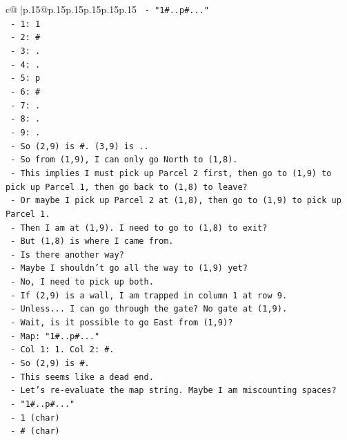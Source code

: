 \documentclass{article}
\begin{document}
{\begin{supertabular}{c@{$\;$}|p{.15\linewidth}@{}p{.15\linewidth}p{.15\linewidth}p{.15\linewidth}p{.15\linewidth}p{.15\linewidth}}
{{{\texttt{   {-} "1\#..p\#..."} \\
\texttt{   {-} 1: 1} \\
\texttt{   {-} 2: \#} \\
\texttt{   {-} 3: .} \\
\texttt{   {-} 4: .} \\
\texttt{   {-} 5: p} \\
\texttt{   {-} 6: \#} \\
\texttt{   {-} 7: .} \\
\texttt{   {-} 8: .} \\
\texttt{   {-} 9: .} \\
\texttt{   {-} So (2,9) is \#. (3,9) is ..} \\
\texttt{   {-} So from (1,9), I can only go North to (1,8).} \\
\texttt{   {-} This implies I must pick up Parcel 2 first, then go to (1,9) to pick up Parcel 1, then go back to (1,8) to leave?} \\
\texttt{   {-} Or maybe I pick up Parcel 2 at (1,8), then go to (1,9) to pick up Parcel 1.} \\
\texttt{   {-} Then I am at (1,9). I need to go to (1,8) to exit?} \\
\texttt{   {-} But (1,8) is where I came from.} \\
\texttt{   {-} Is there another way?} \\
\texttt{   {-} Maybe I shouldn't go all the way to (1,9) yet?} \\
\texttt{   {-} No, I need to pick up both.} \\
\texttt{   {-} If (2,9) is a wall, I am trapped in column 1 at row 9.} \\
\texttt{   {-} Unless... I can go through the gate? No gate at (1,9).} \\
\texttt{   {-} Wait, is it possible to go East from (1,9)?} \\
\texttt{   {-} Map: "1\#..p\#..."} \\
\texttt{   {-} Col 1: 1. Col 2: \#.} \\
\texttt{   {-} So (2,9) is \#.} \\
\texttt{   {-} This seems like a dead end.} \\
\texttt{   {-} Let's re{-}evaluate the map string. Maybe I am miscounting spaces?} \\
\texttt{   {-} "1\#..p\#..."} \\
\texttt{   {-} 1 (char)} \\
\texttt{   {-} \# (char)} \\
}}}
\end{supertabular}}
\end{document}
